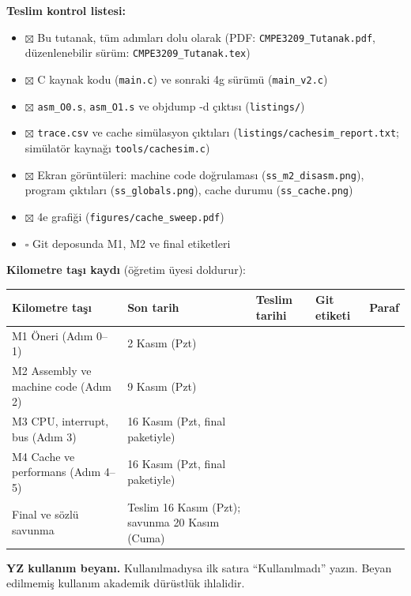 \documentclass[11pt,a4paper]{article}
\newcommand{\tl}{\texttt}
\newcommand{\hd}[1]{\cellcolor{hdr}#1}
\begin{document}
\textbf{Teslim kontrol listesi:}

\begin{itemize}[leftmargin=2em,itemsep=1pt,topsep=2pt]
\item $\boxtimes$ Bu tutanak, tüm adımları dolu olarak (PDF: \tl{CMPE3209\_Tutanak.pdf}, düzenlenebilir sürüm: \tl{CMPE3209\_Tutanak.tex})
\item $\boxtimes$ C kaynak kodu (\tl{main.c}) ve sonraki 4g sürümü (\tl{main\_v2.c})
\item $\boxtimes$ \tl{asm\_O0.s}, \tl{asm\_O1.s} ve objdump -d çıktısı (\tl{listings/})
\item $\boxtimes$ \tl{trace.csv} ve cache simülasyon çıktıları (\tl{listings/cachesim\_report.txt}; simülatör kaynağı \tl{tools/cachesim.c})
\item $\boxtimes$ Ekran görüntüleri: machine code doğrulaması (\tl{ss\_m2\_disasm.png}), program çıktıları (\tl{ss\_globals.png}), cache durumu (\tl{ss\_cache.png})
\item $\boxtimes$ 4e grafiği (\tl{figures/cache\_sweep.pdf})
\item $\square$ Git deposunda M1, M2 ve final etiketleri
\end{itemize}

\textbf{Kilometre taşı kaydı} (öğretim üyesi doldurur):

\begin{longtable}{|p{4.4cm}|p{4.2cm}|p{2.4cm}|p{2.2cm}|p{1.6cm}|}
\hline
\hd{Kilometre taşı} & \hd{Son tarih} & \hd{Teslim tarihi} & \hd{Git etiketi} & \hd{Paraf}\\
\hline
M1 Öneri (Adım 0--1) & 2 Kasım (Pzt) & & & \\ \hline
M2 Assembly ve machine code (Adım 2) & 9 Kasım (Pzt) & & & \\ \hline
M3 CPU, interrupt, bus (Adım 3) & 16 Kasım (Pzt, final paketiyle) & & & \\ \hline
M4 Cache ve performans (Adım 4--5) & 16 Kasım (Pzt, final paketiyle) & & & \\ \hline
Final ve sözlü savunma & Teslim 16 Kasım (Pzt); savunma 20 Kasım (Cuma) & & & \\ \hline
\end{longtable}

\textbf{YZ kullanım beyanı.} Kullanılmadıysa ilk satıra ``Kullanılmadı'' yazın. Beyan edilmemiş
kullanım akademik dürüstlük ihlalidir.
\end{document}
